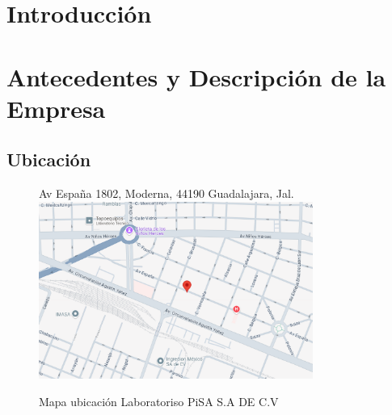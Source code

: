 \documentclass[12pt,letterpaper,spanish, xcolor=table]{report}
\begin{document}


\tableofcontents




\oddsidemargin 0.2in \textwidth 6.5in \topmargin -0.25in
\textheight 9in \pagestyle{myheadings}
	
	
\newpage



\chapter{Introducción}
\newpage




\chapter{Antecedentes y Descripción de la Empresa}
\newpage



\section{Ubicación}
	
\begin{figure}[htp]
	\centering
	Av España 1802, Moderna, 44190 Guadalajara, Jal.
	\includegraphics[width=0.8\textwidth]{Imagenes/ubicacion.png}
	\caption{Mapa ubicación Laboratoriso PiSA S.A DE C.V}\label{a1}
\end{figure}
\end{document}
